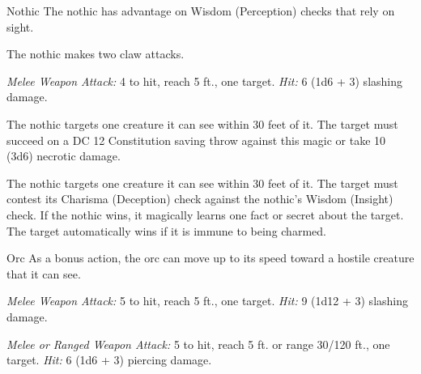 \documentclass[10pt,a4paper,twoside,bg=print,twocolumn,openany,nodeprecatedcode]{dndbook}
\begin{document}
\begin{DndMonster}[float=t]{Nothic}
\DndMonsterBasics[
armor-class = {15 (natural armor)},
hit-points = {\DndDice{6d8 + 18}},
speed = {30 ft.}
]
\DndMonsterAbilityScores[
 str = 14,
 dex = 16,
 con = 16,
 int = 13,
 wis = 10,
 cha = 8
]
\DndMonsterDetails[
skills = {Arcana +3, Insight +4, Perception +2, Stealth +5},
senses = {truesight 120 ft., passive perception 12},
languages = {Undercommon},
challenge = 2,
]
The nothic has advantage on Wisdom (Perception) checks that rely on sight.

The nothic makes two claw attacks.

\textsl{Melee Weapon Attack:} 4 to hit, reach 5 ft., one target. \textsl{Hit:} 6 (1d6 + 3) slashing damage.

The nothic targets one creature it can see within 30 feet of it. The target must succeed on a DC 12 Constitution saving throw against this magic or take 10 (3d6) necrotic damage.

The nothic targets one creature it can see within 30 feet of it. The target must contest its Charisma (Deception) check against the nothic's Wisdom (Insight) check. If the nothic wins, it magically learns one fact or secret about the target. The target automatically wins if it is immune to being charmed.

\end{DndMonster}



\begin{DndMonster}[float=t]{Orc}
\DndMonsterBasics[
armor-class = {13 (\textit{hide armor})},
hit-points = {\DndDice{2d8 + 6}},
speed = {30 ft.}
]
\DndMonsterAbilityScores[
 str = 16,
 dex = 12,
 con = 16,
 int = 7,
 wis = 11,
 cha = 10
]
\DndMonsterDetails[
skills = {Intimidation +2},
senses = {darkvision 60 ft., passive perception 10},
languages = {Common, Orc},
challenge = 1/2,
]
As a bonus action, the orc can move up to its speed toward a hostile creature that it can see.

\textsl{Melee Weapon Attack:} 5 to hit, reach 5 ft., one target. \textsl{Hit:} 9 (1d12 + 3) slashing damage.

\textsl{Melee or Ranged Weapon Attack:} 5 to hit, reach 5 ft. or range 30/120 ft., one target. \textsl{Hit:} 6 (1d6 + 3) piercing damage.

\end{DndMonster}
\end{document}
